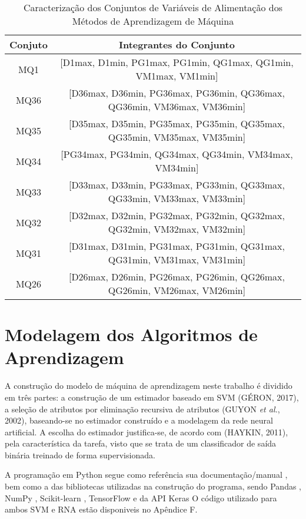 \documentclass[12pt,oneside,a4paper,chapter=TITLE,section=TITLE,sumario=tradicional,english,brazil]{abntex2}
\begin{document}
\begin{table}
\centering
\caption{Caracterização dos Conjuntos de Variáveis de Alimentação dos Métodos de Aprendizagem de Máquina}
\begin{tabular}{c|c}
\toprule
   Conjuto &                                                                      Integrantes do Conjunto \\
\midrule
 MQ1 &         [D1max, D1min, PG1max, PG1min, QG1max, QG1min, VM1max, VM1min] \\
MQ36 & [D36max, D36min, PG36max, PG36min, QG36max, QG36min, VM36max, VM36min] \\
MQ35 & [D35max, D35min, PG35max, PG35min, QG35max, QG35min, VM35max, VM35min] \\
MQ34 &                 [PG34max, PG34min, QG34max, QG34min, VM34max, VM34min] \\
MQ33 & [D33max, D33min, PG33max, PG33min, QG33max, QG33min, VM33max, VM33min] \\
MQ32 & [D32max, D32min, PG32max, PG32min, QG32max, QG32min, VM32max, VM32min] \\
MQ31 & [D31max, D31min, PG31max, PG31min, QG31max, QG31min, VM31max, VM31min] \\
MQ26 & [D26max, D26min, PG26max, PG26min, QG26max, QG26min, VM26max, VM26min] \\
\bottomrule
\end{tabular}
\end{table}
\section{Modelagem dos Algoritmos de Aprendizagem}
A construção do modelo de máquina de aprendizagem neste trabalho é dividido em três partes: a construção de um estimador baseado em SVM (GÉRON, 2017), a seleção de atributos por eliminação recursiva de atributos (GUYON \textit{et al.}, 2002), baseando-se no estimador construído e a modelagem da rede neural artificial. A escolha do estimador justifica-se, de acordo com (HAYKIN, 2011), pela característica da tarefa, visto que se trata de um classificador de saída binária treinado de forma supervisionada.\par 
A programação em Python segue como referência sua documentação/manual \cite{python}, bem como a das bibliotecas utilizadas na construção do programa, sendo Pandas \cite{pandas}, NumPy \cite{numpy}, Scikit-learn \cite{sklearn}, TensorFlow \cite{tensorflow} e da API Keras \cite{keras} 	O código utilizado para ambos SVM e RNA estão disponiveis no Apêndice F.\par 
\end{document}
